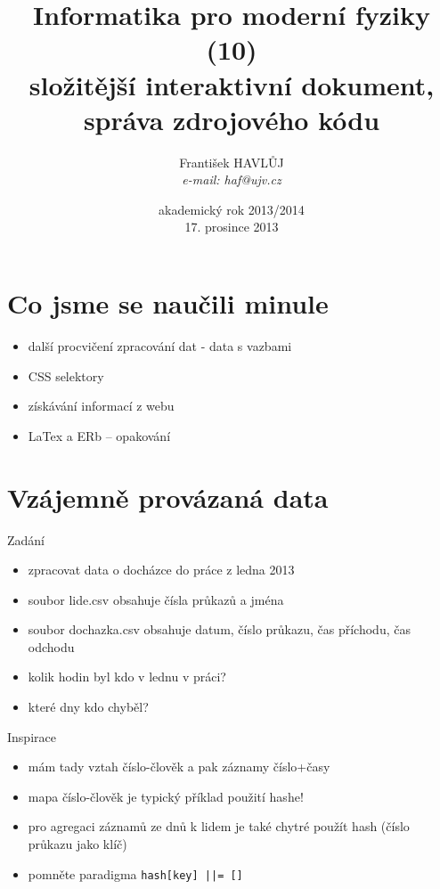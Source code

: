 \documentclass{beamer}
\title[IMF (10)]{Informatika pro moderní fyziky (10)\\ složitější interaktivní dokument, správa zdrojového kódu}
\author[Franti\v{s}ek HAVL\r{U}J, ORF ÚJV Řež]{Franti\v{s}ek HAVL\r{U}J\\{\scriptsize \emph{e-mail: haf@ujv.cz}}}
\date{akademický rok 2013/2014\\17. prosince 2013}
\institute[ORF ÚJV Řež]
{ÚJV Řež\\oddělení Reaktorové fyziky a podpory palivového cyklu}
\begin{document}
\begin{frame}
  \titlepage
\end{frame}

\begin{frame}
  \tableofcontents
\end{frame}

\section{Co jsme se naučili minule}

\begin{frame}{}
  \begin{itemize}
    \item další procvičení zpracování dat - data s vazbami
    \item CSS selektory
    \item získávání informací z webu
    \item LaTex a ERb -- opakování
  \end{itemize}
\end{frame}

\section{Vzájemně provázaná data}

\begin{frame}{Zadání}
  \begin{itemize}
    \item zpracovat data o docházce do práce z ledna 2013
    \item soubor lide.csv obsahuje čísla průkazů a jména
    \item soubor dochazka.csv obsahuje datum, číslo průkazu, čas příchodu, čas odchodu
    \item kolik hodin byl kdo v lednu v práci?
    \item které dny kdo chyběl?
  \end{itemize}
\end{frame}

\begin{frame}{Inspirace}
  \begin{itemize}
    \item mám tady vztah číslo-člověk a pak záznamy číslo+časy
    \item mapa číslo-člověk je typický příklad použití hashe!
    \item pro agregaci záznamů ze dnů k lidem je také chytré použít hash (číslo průkazu jako klíč)
    \item pomněte paradigma \texttt{hash[key] ||= []}
  \end{itemize}
\end{frame}
\end{document}

